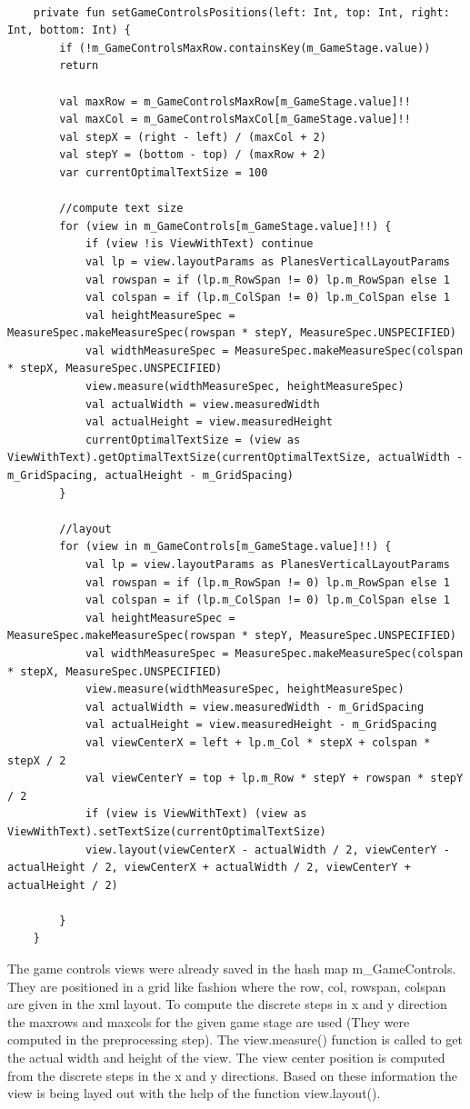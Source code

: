 \begin{lstlisting}

	private fun setGameControlsPositions(left: Int, top: Int, right: Int, bottom: Int) {
		if (!m_GameControlsMaxRow.containsKey(m_GameStage.value))
		return
		
		val maxRow = m_GameControlsMaxRow[m_GameStage.value]!!
		val maxCol = m_GameControlsMaxCol[m_GameStage.value]!!
		val stepX = (right - left) / (maxCol + 2)
		val stepY = (bottom - top) / (maxRow + 2)
		var currentOptimalTextSize = 100
		
		//compute text size
		for (view in m_GameControls[m_GameStage.value]!!) {
			if (view !is ViewWithText) continue
			val lp = view.layoutParams as PlanesVerticalLayoutParams
			val rowspan = if (lp.m_RowSpan != 0) lp.m_RowSpan else 1
			val colspan = if (lp.m_ColSpan != 0) lp.m_ColSpan else 1
			val heightMeasureSpec = MeasureSpec.makeMeasureSpec(rowspan * stepY, MeasureSpec.UNSPECIFIED)
			val widthMeasureSpec = MeasureSpec.makeMeasureSpec(colspan * stepX, MeasureSpec.UNSPECIFIED)
			view.measure(widthMeasureSpec, heightMeasureSpec)
			val actualWidth = view.measuredWidth
			val actualHeight = view.measuredHeight
			currentOptimalTextSize = (view as ViewWithText).getOptimalTextSize(currentOptimalTextSize, actualWidth - m_GridSpacing, actualHeight - m_GridSpacing)
		}
		
		//layout
		for (view in m_GameControls[m_GameStage.value]!!) {
			val lp = view.layoutParams as PlanesVerticalLayoutParams
			val rowspan = if (lp.m_RowSpan != 0) lp.m_RowSpan else 1
			val colspan = if (lp.m_ColSpan != 0) lp.m_ColSpan else 1
			val heightMeasureSpec = MeasureSpec.makeMeasureSpec(rowspan * stepY, MeasureSpec.UNSPECIFIED)
			val widthMeasureSpec = MeasureSpec.makeMeasureSpec(colspan * stepX, MeasureSpec.UNSPECIFIED)
			view.measure(widthMeasureSpec, heightMeasureSpec)
			val actualWidth = view.measuredWidth - m_GridSpacing
			val actualHeight = view.measuredHeight - m_GridSpacing
			val viewCenterX = left + lp.m_Col * stepX + colspan * stepX / 2
			val viewCenterY = top + lp.m_Row * stepY + rowspan * stepY / 2
			if (view is ViewWithText) (view as ViewWithText).setTextSize(currentOptimalTextSize)
			view.layout(viewCenterX - actualWidth / 2, viewCenterY - actualHeight / 2, viewCenterX + actualWidth / 2, viewCenterY + actualHeight / 2)
			
		}
	}

\end{lstlisting}

The game controls views were already saved in the hash map m\_GameControls. They are positioned in a grid like fashion where the row, col, rowspan, colspan are given in the xml layout. To compute the discrete steps in x and y direction the maxrows and maxcols for the given game stage are used (They were computed in the preprocessing step). The view.measure() function is called to get the actual width and height of the view. The view center position is computed from the discrete steps in the x and y directions. Based on these information the view is being layed out with the help of the function view.layout().


